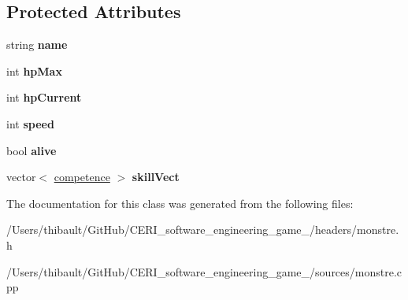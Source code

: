 \subsection*{Protected Attributes}
\begin{DoxyCompactItemize}
\item 
\mbox{\label{classmonstre_a6036af5aad5e24711cdf0f6403e3b46e}} 
string {\bfseries name}
\item 
\mbox{\label{classmonstre_a6cca6a9a3788ab7fca2e6ee7c321b7ea}} 
int {\bfseries hp\+Max}
\item 
\mbox{\label{classmonstre_afc39f2b9c79b34c7690886b9fd1f97f9}} 
int {\bfseries hp\+Current}
\item 
\mbox{\label{classmonstre_a2a118a2943476096ff05f0ddbee5a2eb}} 
int {\bfseries speed}
\item 
\mbox{\label{classmonstre_aca8671e46fd6e20fd0c1afeb276f6da4}} 
bool {\bfseries alive}
\item 
\mbox{\label{classmonstre_ad8cabac44854155b68f309fa54aab742}} 
vector$<$ \hyperlink{classcompetence}{competence} $>$ {\bfseries skill\+Vect}
\end{DoxyCompactItemize}


The documentation for this class was generated from the following files\+:\begin{DoxyCompactItemize}
\item 
/\+Users/thibault/\+Git\+Hub/\+C\+E\+R\+I\+\_\+software\+\_\+engineering\+\_\+game\+\_/headers/monstre.\+h\item 
/\+Users/thibault/\+Git\+Hub/\+C\+E\+R\+I\+\_\+software\+\_\+engineering\+\_\+game\+\_/sources/monstre.\+cpp\end{DoxyCompactItemize}
